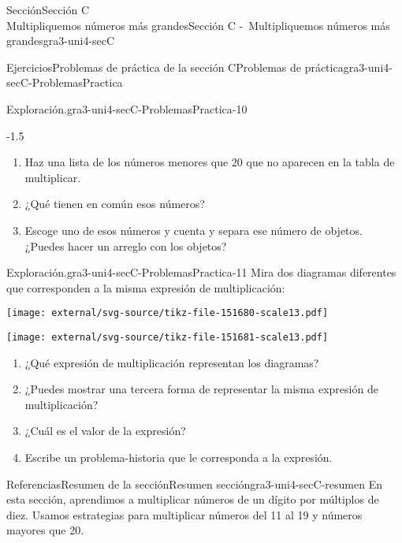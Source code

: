 \begin{sectionptx}{Sección}{{\Large Sección C\\}Multipliquemos números más grandes}{}{Sección C -~Multipliquemos números más grandes}{}{}{gra3-uni4-secC}
\begin{exercises-subsection}{Ejercicios}{Problemas de práctica de la sección C}{}{Problemas de práctica}{}{}{gra3-uni4-secC-ProblemasPractica}
\begin{divisionexercise}{8}{Exploración.}{}{gra3-uni4-secC-ProblemasPractica-10}
\begin{image}{0}{1}{0}{-1.5\baselineskip}
\end{image}%
%
\begin{enumerate}[label={(\alph*)}]
\item{}Haz una lista de los números menores que 20 que no aparecen en la tabla de multiplicar.%
\item{}¿Qué tienen en común esos números?%
\item{}Escoge uno de esos números y cuenta y separa ese número de objetos. ¿Puedes hacer un arreglo con los objetos?%
\end{enumerate}
\end{divisionexercise}%
\begin{divisionexercise}{9}{Exploración.}{}{gra3-uni4-secC-ProblemasPractica-11}%
Mira dos diagramas diferentes que corresponden a la misma expresión de multiplicación:%
\begin{sidebyside}{2}{0.025}{0.025}{0.05}%
\begin{sbspanel}{0.45}%
\texttt{[image: external/svg-source/tikz-file-151680-scale13.pdf]}
\end{sbspanel}%
\begin{sbspanel}{0.45}%
\texttt{[image: external/svg-source/tikz-file-151681-scale13.pdf]}
\end{sbspanel}%
\end{sidebyside}%
%
\begin{enumerate}[label={(\alph*)}]
\item{}¿Qué expresión de multiplicación representan los diagramas?%
\item{}¿Puedes mostrar una tercera forma de representar la misma expresión de multiplicación?%
\item{}¿Cuál es el valor de la expresión?%
\item{}Escribe un problema-historia que le corresponda a la expresión.%
\end{enumerate}
\end{divisionexercise}%
\end{exercises-subsection}
%
%
\typeout{************************************************}
\typeout{************************************************}
%
\begin{references-subsection}{Referencias}{Resumen de la sección}{}{Resumen sección}{}{}{gra3-uni4-secC-resumen}
En esta sección, aprendimos a multiplicar números de un dígito por múltiplos de diez. Usamos estrategias para multiplicar números del 11 al 19 y números mayores que 20.%

\end{references-subsection}
\end{sectionptx}
